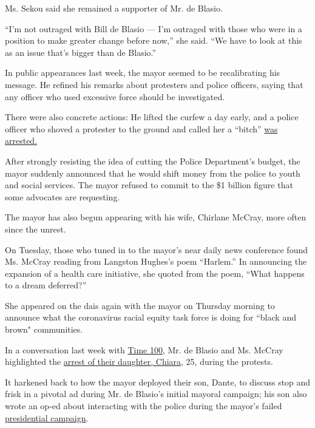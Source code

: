 Ms. Sekou said she remained a supporter of Mr. de Blasio.

``I'm not outraged with Bill de Blasio --- I'm outraged with those who
were in a position to make greater change before now,'' she said. ``We
have to look at this as an issue that's bigger than de Blasio.''

In public appearances last week, the mayor seemed to be recalibrating
his message. He refined his remarks about protesters and police
officers, saying that any officer who used excessive force should be
investigated.

There were also concrete actions: He lifted the curfew a day early, and
a police officer who shoved a protester to the ground and called her a
``bitch''
\href{https://www.nytimes3xbfgragh.onion/2020/06/09/nyregion/nypd-officer-vincent-dandraia-arrest.html}{was
arrested.}

After strongly resisting the idea of cutting the Police Department's
budget, the mayor suddenly announced that he would shift money from the
police to youth and social services. The mayor refused to commit to the
\$1 billion figure that some advocates are requesting.

The mayor has also begun appearing with his wife, Chirlane McCray, more
often since the unrest.

On Tuesday, those who tuned in to the mayor's near daily news conference
found Ms. McCray reading from Langston Hughes's poem ``Harlem.'' In
announcing the expansion of a health care initiative, she quoted from
the poem, ``What happens to a dream deferred?''

She appeared on the dais again with the mayor on Thursday morning to
announce what the coronavirus racial equity task force is doing for
``black and brown" communities.

In a conversation last week with
\href{https://time.com/5850041/bill-de-blasio-chirlane-mccray-time-100-talks/}{Time
100}, Mr. de Blasio and Ms. McCray highlighted the
\href{https://www.nytimes3xbfgragh.onion/2020/06/01/nyregion/chiara-de-blasio-arrest.html}{arrest
of their daughter, Chiara}, 25, during the protests.

It harkened back to how the mayor deployed their son, Dante, to discuss
stop and frisk in a pivotal ad during Mr. de Blasio's initial mayoral
campaign; his son also wrote an op-ed about interacting with the police
during the mayor's failed
\href{https://www.nytimes3xbfgragh.onion/2019/07/12/nyregion/dante-de-blasio-2020-iowa.html}{presidential
campaign}.

